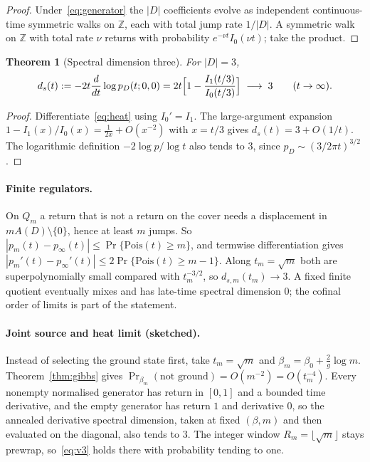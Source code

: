 \documentclass[11pt]{article}
\newtheorem{theorem}{Theorem}[section]
\theoremstyle{definition}
\theoremstyle{remark}
\newcommand{\Z}{\mathbb{Z}}
\begin{document}
\begin{proof}
Under~\eqref{eq:generator} the $|D|$ coefficients evolve as independent continuous-time
symmetric walks on $\Z$, each with total jump rate $1/|D|$. A symmetric walk on $\Z$ with
total rate $\nu$ returns with probability $e^{-\nu t}I_0(\nu t)$; take the product.
\end{proof}

\begin{theorem}[Spectral dimension three]
\label{thm:ds}
For $|D|=3$,
\begin{equation}
d_s(t):=-2t\frac{d}{dt}\log p_D(t;0,0)=2t\Bigl[1-\frac{I_1(t/3)}{I_0(t/3)}\Bigr]
\;\longrightarrow\;3\qquad(t\to\infty).
\label{eq:ds}
\end{equation}
\end{theorem}

\begin{proof}
Differentiate~\eqref{eq:heat} using $I_0'=I_1$. The large-argument expansion
$1-I_1(x)/I_0(x)=\frac{1}{2x}+O(x^{-2})$ with $x=t/3$ gives $d_s(t)=3+O(1/t)$. The
logarithmic definition $-2\log p/\log t$ also tends to $3$, since
$p_D\sim(3/2\pi t)^{3/2}$.
\end{proof}

\paragraph{Finite regulators.} On $Q_m$ a return that is not a return on the cover needs
a displacement in $mA(D)\setminus\{0\}$, hence at least $m$ jumps. So
$|p_m(t)-p_\infty(t)|\le\Pr\{\mathrm{Pois}(t)\ge m\}$, and termwise differentiation gives
$|p_m'(t)-p_\infty'(t)|\le2\Pr\{\mathrm{Pois}(t)\ge m-1\}$. Along $t_m=\sqrt m$ both are
superpolynomially small compared with $t_m^{-3/2}$, so $d_{s,m}(t_m)\to3$. A fixed finite
quotient eventually mixes and has late-time spectral dimension $0$; the cofinal order of
limits is part of the statement.

\paragraph{Joint source and heat limit (sketched).} Instead of selecting the ground state
first, take $t_m=\sqrt m$ and $\beta_m=\beta_0+\frac2g\log m$. Theorem~\ref{thm:gibbs}
gives $\Pr_{\beta_m}(\text{not ground})=O(m^{-2})=O(t_m^{-4})$. Every nonempty normalised
generator has return in $[0,1]$ and a bounded time derivative, and the empty generator
has return $1$ and derivative $0$, so the annealed derivative spectral dimension, taken
at fixed $(\beta,m)$ and then evaluated on the diagonal, also tends to $3$. The integer
window $R_m=\lfloor\sqrt m\rfloor$ stays prewrap, so~\eqref{eq:v3} holds there with
probability tending to one.
\end{document}
